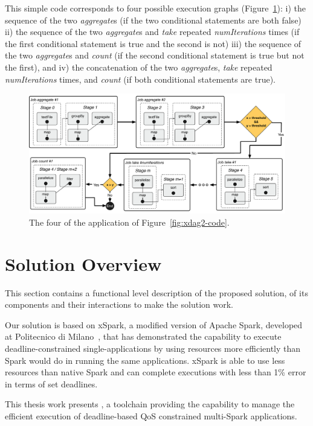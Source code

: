 This simple code corresponds to four possible execution graphs (Figure~\ref{fig:xdag2}): i) the sequence of the two \textit{aggregate}s  (if the two conditional statements are both false) ii) the sequence of the two \textit{aggregate}s and \textit{take} repeated \textit{numIterations} times (if the first conditional statement is true and the second is not) iii) the sequence of the two \textit{aggregate}s and \textit{count} (if the second conditional statement is true but not the first), and iv) the concatenation of the two \textit{aggregate}s, \textit{take} repeated \textit{numIterations} times, and \textit{count} (if both conditional statements are true).

\begin{figure}[t]
	\centering
	\includegraphics[width=\columnwidth]{images/xdag2.pdf}
	\caption{The four  \plans of the application of Figure~\ref{fig:xdag2-code}.}
	\label{fig:xdag2}
\end{figure}

\section{Solution Overview}\label{sec:solution_overview}
This section contains a functional level description of the proposed solution, of its components and their interactions to make the solution work.

Our solution is based on xSpark, a modified version of Apache Spark, developed at Politecnico di Milano~\cite{xsparkreport, Quattrocchi2018}, that has demonstrated the capability to execute deadline-constrained single-\plan applications by using resources more efficiently than  Spark would do in running the same applications. xSpark is able to use less resources than native Spark and can complete executions with less than 1\% error in terms of set deadlines.

This thesis work presents \tool, a toolchain providing the capability to manage the efficient execution of deadline-based QoS constrained multi-\plan Spark applications. 

